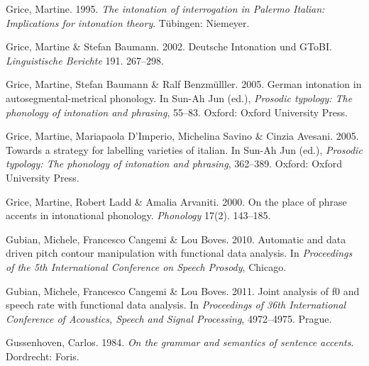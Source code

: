\documentclass[ number=1
,series=labphon
,output=long
,url=http://langsci-press.org/catalog/book/16
,isbn=978-3-944675-01-5
]{LSP/langsci}
\begin{document}
\begin{thebibliography}{284}
Grice, Martine. 1995.
\newblock \emph{The intonation of interrogation in {P}alermo {I}talian:
  {I}mplications for intonation theory}.
\newblock T\"{u}bingen: Niemeyer.

Grice, Martine \& Stefan Baumann. 2002.
\newblock Deutsche {I}ntonation und {GToBI}.
\newblock \emph{Linguistische Berichte} 191. 267--298.

Grice, Martine, Stefan Baumann \& Ralf Benzm\"{u}lller. 2005{}.
\newblock German intonation in autosegmental-metrical phonology.
\newblock In Sun-Ah Jun (ed.), \emph{Prosodic typology: {T}he phonology of
  intonation and phrasing}, 55--83. Oxford: Oxford University Press.

Grice, Martine, Mariapaola D'Imperio, Michelina Savino \& Cinzia Avesani.
  2005{}.
\newblock Towards a strategy for labelling varieties of italian.
\newblock In Sun-Ah Jun (ed.), \emph{Prosodic typology: {T}he phonology of
  intonation and phrasing}, 362--389. Oxford: Oxford University Press.

Grice, Martine, Robert Ladd \& Amalia Arvaniti. 2000.
\newblock On the place of phrase accents in intonational phonology.
\newblock \emph{Phonology} 17(2). 143--185.

Gubian, Michele, Francesco Cangemi \& Lou Boves. 2010.
\newblock Automatic and data driven pitch contour manipulation with functional
  data analysis.
\newblock In \emph{Proceedings of the 5th {I}nternational {C}onference on
  {S}peech {P}rosody}, Chicago.

\enlargethispage{\baselineskip}
Gubian, Michele, Francesco Cangemi \& Lou Boves. 2011.
\newblock Joint analysis of f0 and speech rate with functional data analysis.
\newblock In \emph{Proceedings of 36th {I}nternational {C}onference of
  {A}coustics, {S}peech and {S}ignal {P}rocessing}, 4972--4975. Prague.

Gussenhoven, Carlos. 1984.
\newblock \emph{On the grammar and semantics of sentence accents}.
\newblock Dordrecht: Foris.


\end{thebibliography}
\end{document}
